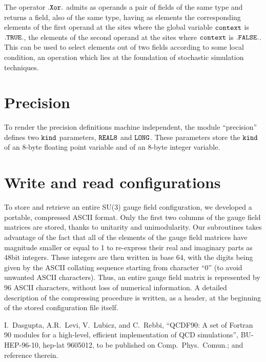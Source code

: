 The operator $\tt .Xor.$ admits as operands a pair of fields
of the same type and returns a field, also of the same type,
having as elements the corresponding elements of the first operand 
at the sites where the global variable $\tt context$ is $\tt .TRUE.$, 
the elements of the second operand at the sites where 
$\tt context$ is $\tt .FALSE.$. 
This can be used to select elements out of two fields according 
to some local condition, an operation which lies at the 
foundation of stochastic simulation techniques. 


\section{Precision }

To render the precision
definitions machine independent, the module ``precision''
defines two  $\tt kind $ parameters, $\tt REAL8 $ and $\tt LONG $.
These parameters store the $\tt kind $ of an 8-byte 
floating point variable and of an 8-byte integer variable.


\section{Write and read configurations}

To store and retrieve an entire SU(3) gauge field 
configuration, we developed a portable, compressed ASCII format.  
Only the first two columns of the gauge field matrices are stored, 
thanks to unitarity and unimodularity.
Our subroutines takes advantage of the fact
that all of the elements of the gauge field matrices have magnitude
smaller or equal to 1 to re-express their real and imaginary parts 
as 48bit integers.  These integers are then written in base 64,
with the digits being given by the ASCII collating sequence
starting from character ``0'' (to avoid unwanted ASCII characters).
Thus, an entire gauge field matrix is represented 
by 96 ASCII characters, without loss of numerical information.  
A detailed description of the compressing procedure is written, 
as a header, at the beginning of the stored configuration file itself.


\begin{thebibliography}{9}

          I.~Dasgupta, A.R.~Levi, V.~Lubicz, and C.~Rebbi, 
          ``QCDF90: A set of Fortran 90 modules for a high-level,
          efficient implementation of QCD simulations'',
          BU-HEP-96-10, hep-lat 9605012, 
          to be published on Comp.~Phys.~Comun.;
          and reference therein.

\end{thebibliography}



